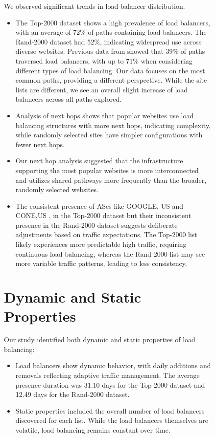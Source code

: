 \documentclass[12pt]{cwru_thesis}
\begin{document}
\begin{figure}[h!]
We observed significant trends in load balancer distribution:
\begin{itemize}
    \item The Top-2000 dataset shows a high prevalence of load balancers, with an average of 72\% of paths containing load balancers. The Rand-2000 dataset had 52\%, indicating widespread use across diverse websites. Previous data from \cite{augustin2010measuring} showed that 39\% of paths traversed load balancers, with up to 71\% when considering different types of load balancing. Our data focuses on the most common paths, providing a different perspective. While the site lists are different, we see an overall slight increase of load balancers across all paths explored.
    \item Analysis of next hops shows that popular websites use load balancing structures with more next hops, indicating complexity, while randomly selected sites have simpler configurations with fewer next hops.
    \item Our next hop analysis suggested that the infrastructure supporting the most popular websites is more interconnected and utilizes shared pathways more frequently than the broader, randomly selected websites.
    \item The consistent presence of ASes like GOOGLE, US and CONE,US , in the Top-2000 dataset but their inconsistent presence in the Rand-2000 dataset suggests deliberate adjustments based on traffic expectations. The Top-2000 list likely experiences more predictable high traffic, requiring continuous load balancing, whereas the Rand-2000 list may see more variable traffic patterns, leading to less consistency.
\end{itemize}

\section*{Dynamic and Static Properties}

Our study identified both dynamic and static properties of load balancing:
\begin{itemize}
    \item Load balancers show dynamic behavior, with daily additions and removals reflecting adaptive traffic management. The average presence duration was 31.10 days for the Top-2000 dataset and 12.49 days for the Rand-2000 dataset.
    \item Static properties included the overall number of load balancers discovered for each list. While the load balancers themselves are volatile, load balancing remains constant over time.
    

\end{itemize}
\end{figure}
\end{document}
